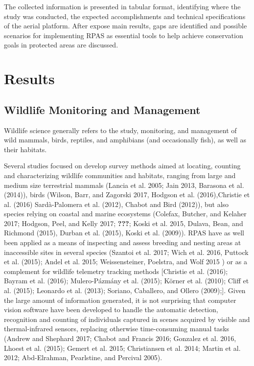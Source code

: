 \documentclass[]{interact}
\theoremstyle{plain}%
\theoremstyle{definition}
\theoremstyle{remark}
\begin{document}
The collected information is presented in tabular format, identifying
where the study was conducted, the expected accomplishments and
technical specifications of the aerial platform. After expose main
results, gaps are identified and possible scenarios for implementing
RPAS as essential tools to help achieve conservation goals in protected
areas are discussed.

\section{Results}\label{results}

\subsection{Wildlife Monitoring and
Management}\label{wildlife-monitoring-and-management}

Wildlife science generally refers to the study, monitoring, and
management of wild mammals, birds, reptiles, and amphibians (and
occasionally fish), as well as their habitats.

Several studies focused on develop survey methods aimed at locating,
counting and characterizing wildlife communities and habitats, ranging
from large and medium size terrestrial mammals (Lancia et al. 2005; Jain
2013, Barasona et al. (2014)), birds (Wilson, Barr, and Zagorski 2017,
Hodgson et al. (2016),Christie et al. (2016) Sardà-Palomera et al.
(2012), Chabot and Bird (2012)), but also species relying on coastal and
marine ecosystems (Colefax, Butcher, and Kelaher 2017; Hodgson, Peel,
and Kelly 2017; {\textbf{???}}; Koski et al. 2015, Dulava, Bean, and
Richmond (2015), Durban et al. (2015), Koski et al. (2009)). RPAS have
as well been applied as a means of inspecting and assess breeding and
nesting areas at inaccessible sites in several species (Szantoi et al.
2017; Wich et al. 2016, Puttock et al. (2015); Andel et al. 2015;
Weissensteiner, Poelstra, and Wolf 2015 ) or as a complement for
wildlife telemetry tracking methods {[}Christie et al. (2016); Bayram et
al. (2016); Mulero-Pázmány et al. (2015); Körner et al. (2010); Cliff et
al. (2015); Leonardo et al. (2013); Soriano, Caballero, and Ollero
(2009);{]}. Given the large amount of information generated, it is not
surprising that computer vision software have been developed to handle
the automatic detection, recognition and counting of individuals
captured in scenes acquired by visible and thermal-infrared sensors,
replacing otherwise time-consuming manual tasks (Andrew and Shephard
2017; Chabot and Francis 2016; Gonzalez et al. 2016, Lhoest et al.
(2015); Gemert et al. 2015; Christiansen et al. 2014; Martin et al.
2012; Abd-Elrahman, Pearlstine, and Percival 2005).
\end{document}
